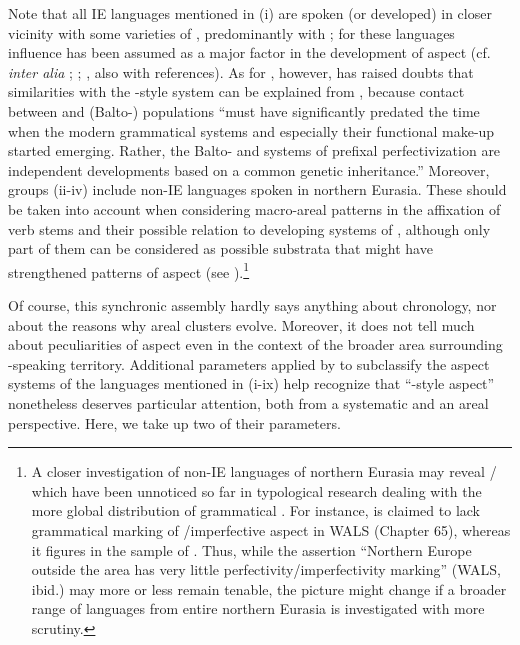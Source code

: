 \documentclass[output=paper]{langsci/langscibook}
\begin{document}
Note that all IE languages mentioned in (i) are spoken (or developed) in closer vicinity with some varieties of , predominantly with ; for these languages  influence has been assumed as a major factor in the development of aspect (cf. \textit{inter alia} \citet{Breu1992}; \citealt{Tomelleri2009,Tomelleri2010}; \citealt[384]{Arkadiev2014}, also with references). As for , however, \citet[399]{Arkadiev2014} has raised doubts that similarities with the -style system can be explained from , because contact between  and (Balto-) populations “must have significantly predated the time when the modern grammatical systems and especially their functional make-up started emerging. Rather, the Balto- and  systems of prefixal perfectivization are independent developments based on a common genetic inheritance.” Moreover, groups (ii-iv) include non-IE languages spoken in northern Eurasia. These should be taken into account when considering macro-areal patterns in the affixation of verb stems and their possible relation to developing systems of , although only part of them can be considered as possible substrata that might have strengthened  patterns of  aspect (see ).\footnote{A closer investigation of non-IE languages of northern Eurasia may reveal /  which have been unnoticed so far in typological research dealing with the more global distribution of grammatical . For instance,  is claimed to lack grammatical marking of /imperfective aspect in WALS (Chapter 65), whereas it figures in the sample of \citet{ArkadievShluinsky2015}. Thus, while the assertion “Northern Europe outside the  area has very little perfectivity/imperfectivity marking” (WALS, ibid.) may more or less remain tenable, the picture might change if a broader range of languages from entire northern Eurasia is investigated with more scrutiny.}

Of course, this synchronic assembly hardly says anything about chronology, nor about the reasons why areal clusters evolve. Moreover, it does not tell much about peculiarities of  aspect even in the context of the broader area surrounding -speaking territory. Additional parameters applied by \citeauthor{ArkadievShluinsky2015} to subclassify the aspect systems of the languages mentioned in (i-ix) help recognize that “-style aspect” nonetheless deserves particular attention, both from a systematic and an areal perspective. Here, we take up two of their parameters.
\end{document}
